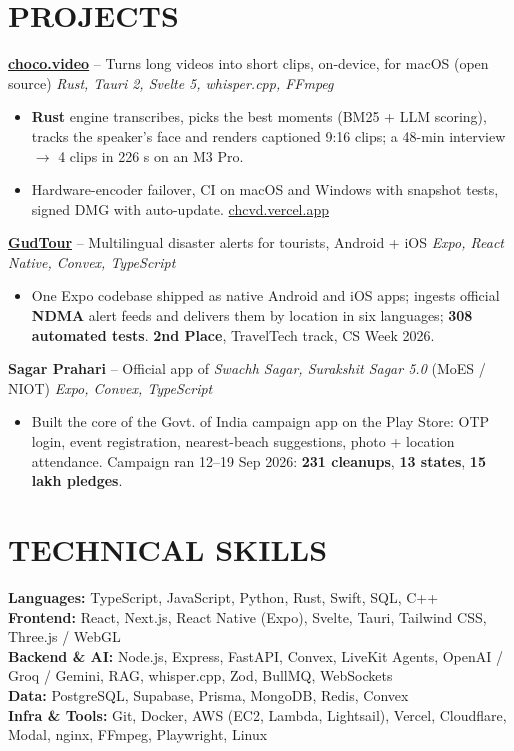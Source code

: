 \documentclass[a4paper,10pt]{article}
\begin{document}
\section*{PROJECTS}
\textbf{\href{https://github.com/YashvanthSankar/choco.video}{choco.video}} -- Turns long videos into short clips, on-device, for macOS (open source) \hfill {\small \textit{Rust, Tauri 2, Svelte 5, whisper.cpp, FFmpeg}}
\begin{itemize}
    \item \textbf{Rust} engine transcribes, picks the best moments (BM25 + LLM scoring), tracks the speaker's face and renders captioned 9:16 clips; a 48-min interview $\rightarrow$ 4 clips in 226 s on an M3 Pro.
    \item Hardware-encoder failover, CI on macOS and Windows with snapshot tests, signed DMG with auto-update. \href{https://chcvd.vercel.app}{chcvd.vercel.app}
\end{itemize}
\vspace{0.5pt}
\noindent\textbf{\href{https://github.com/YashvanthSankar/bits-n-bytes}{GudTour}} -- Multilingual disaster alerts for tourists, Android + iOS \hfill {\small \textit{Expo, React Native, Convex, TypeScript}}
\begin{itemize}
    \item One Expo codebase shipped as native Android and iOS apps; ingests official \textbf{NDMA} alert feeds and delivers them by location in six languages; \textbf{308 automated tests}. \textbf{2nd Place}, TravelTech track, CS Week 2026.
\end{itemize}
\vspace{0.5pt}
\noindent\textbf{Sagar Prahari} -- Official app of \textit{Swachh Sagar, Surakshit Sagar 5.0} (MoES / NIOT) \hfill {\small \textit{Expo, Convex, TypeScript}}
\begin{itemize}
    \item Built the core of the Govt. of India campaign app on the Play Store: OTP login, event registration, nearest-beach suggestions, photo + location attendance. Campaign ran 12--19 Sep 2026: \textbf{231 cleanups}, \textbf{13 states}, \textbf{15 lakh pledges}.
\end{itemize}

\section*{TECHNICAL SKILLS}
\textbf{Languages:} TypeScript, JavaScript, Python, Rust, Swift, SQL, C++ \\
\textbf{Frontend:} React, Next.js, React Native (Expo), Svelte, Tauri, Tailwind CSS, Three.js / WebGL \\
\textbf{Backend \& AI:} Node.js, Express, FastAPI, Convex, LiveKit Agents, OpenAI / Groq / Gemini, RAG, whisper.cpp, Zod, BullMQ, WebSockets \\
\textbf{Data:} PostgreSQL, Supabase, Prisma, MongoDB, Redis, Convex \\
\textbf{Infra \& Tools:} Git, Docker, AWS (EC2, Lambda, Lightsail), Vercel, Cloudflare, Modal, nginx, FFmpeg, Playwright, Linux
\end{document}
